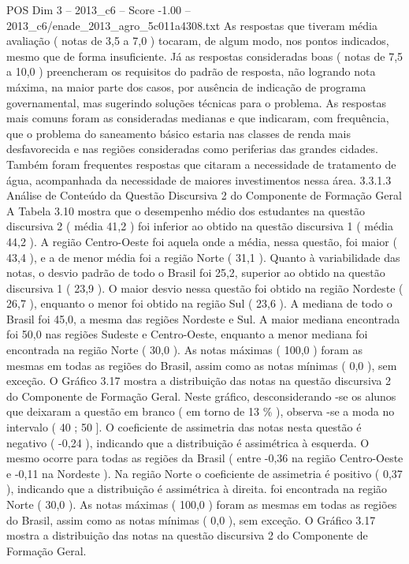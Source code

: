\begin{textsample}{POS Dim 3 – 2013\_c6 – Score -1.00 – 2013\_c6/enade\_2013\_agro\_5c011a4308.txt}
As respostas que tiveram média avaliação ( notas de 3,5 a 7,0 ) tocaram, de algum modo, nos pontos indicados, mesmo que de forma insuficiente.
Já as respostas consideradas boas ( notas de 7,5 a 10,0 ) preencheram os requisitos do padrão de resposta, não logrando nota máxima, na maior parte dos casos, por ausência de indicação de programa governamental, mas sugerindo soluções técnicas para o problema.
As respostas mais comuns foram as consideradas medianas e que indicaram, com frequência, que o problema do saneamento básico estaria nas classes de renda mais desfavorecida e nas regiões consideradas como periferias das grandes cidades.
Também foram frequentes respostas que citaram a necessidade de tratamento de água, acompanhada da necessidade de maiores investimentos nessa área. 3.3.1.3 Análise de Conteúdo da Questão Discursiva 2 do Componente de Formação Geral A Tabela 3.10 mostra que o desempenho médio dos estudantes na questão discursiva 2 ( média 41,2 ) foi inferior ao obtido na questão discursiva 1 ( média 44,2 ).
A região Centro-Oeste foi aquela onde a média, nessa questão, foi maior ( 43,4 ), e a de menor média foi a região Norte ( 31,1 ).
Quanto à variabilidade das notas, o desvio padrão de todo o Brasil foi 25,2, superior ao obtido na questão discursiva 1 ( 23,9 ).
O maior desvio nessa questão foi obtido na região Nordeste ( 26,7 ), enquanto o menor foi obtido na região Sul ( 23,6 ).
A mediana de todo o Brasil foi 45,0, a mesma das regiões Nordeste e Sul.
A maior mediana encontrada foi 50,0 nas regiões Sudeste e Centro-Oeste, enquanto a menor mediana foi encontrada na região Norte ( 30,0 ).
As notas máximas ( 100,0 ) foram as mesmas em todas as regiões do Brasil, assim como as notas mínimas ( 0,0 ), sem exceção.
O Gráfico 3.17 mostra a distribuição das notas na questão discursiva 2 do Componente de Formação Geral.
Neste gráfico, desconsiderando -se os alunos que deixaram a questão em branco ( em torno de 13 \% ), observa -se a moda no intervalo ( 40 ; 50 ].
O coeficiente de assimetria das notas nesta questão é negativo ( -0,24 ), indicando que a distribuição é assimétrica à esquerda.
O mesmo ocorre para todas as regiões da Brasil ( entre -0,36 na região Centro-Oeste e -0,11 na Nordeste ).
Na região Norte o coeficiente de assimetria é positivo ( 0,37 ), indicando que a distribuição é assimétrica à direita. foi encontrada na região Norte ( 30,0 ).
As notas máximas ( 100,0 ) foram as mesmas em todas as regiões do Brasil, assim como as notas mínimas ( 0,0 ), sem exceção.
O Gráfico 3.17 mostra a distribuição das notas na questão discursiva 2 do Componente de Formação Geral.

\end{textsample}
